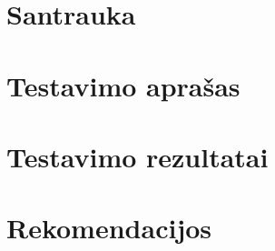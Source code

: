   

  \section{Santrauka}
  

  \newpage
  \section{Testavimo aprašas}
  

  \newpage
  \section{Testavimo rezultatai}
  

  \newpage
  \section{Rekomendacijos}
  

\newpage
{}


\newpage

